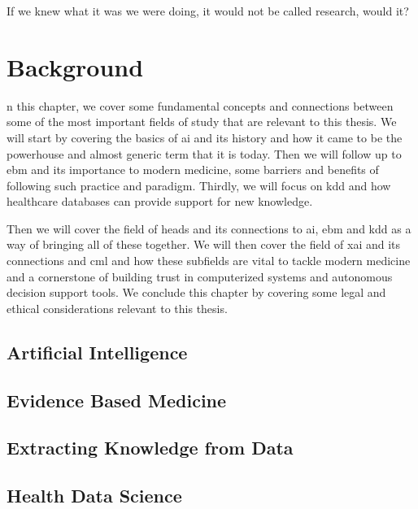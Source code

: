 

\begin{savequote}[75mm]
    If we knew what it was we were doing, it would not be called research, would it?
    \end{savequote}

\chapter{Background} \label{chap:sota}


n this chapter, we cover some fundamental concepts and connections between some of the most important fields of study that are relevant to this thesis. We will start by covering the basics of \ac{ai} and its history and how it came to be the powerhouse and almost generic term that it is today. Then we will follow up to \ac{ebm} and its importance to modern medicine, some barriers and benefits of following such practice and paradigm. Thirdly, we will focus on \ac{kdd} and how healthcare databases can provide support for new knowledge.

Then we will cover the field of \ac{heads} and its connections to \ac{ai}, \ac{ebm} and \ac{kdd} as a way of bringing all of these together. We will then cover the field of \ac{xai} and its connections and \ac{cml} and how these subfields are vital to tackle modern medicine and a cornerstone of building trust in computerized systems and autonomous decision support tools. We conclude this chapter by covering some legal and ethical considerations relevant to this thesis.


\section{Artificial Intelligence}\label{sec:ai}


\section{Evidence Based Medicine}\label{sec:ebm}




\section{Extracting Knowledge from Data}\label{sec:kdd}



\section{Health Data Science}\label{sec:heads}

